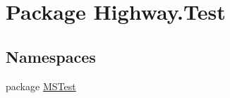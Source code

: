 \hypertarget{namespace_highway_1_1_test}{\section{Package Highway.\-Test}
\label{namespace_highway_1_1_test}
}
\subsection*{Namespaces}
\begin{DoxyCompactItemize}
\item 
package \hyperlink{namespace_highway_1_1_test_1_1_m_s_test}{M\-S\-Test}
\end{DoxyCompactItemize}
